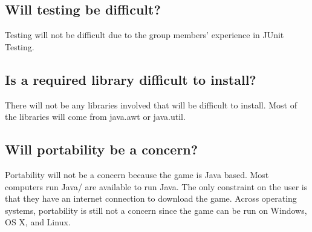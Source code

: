\documentclass{article}
\begin{document}
\subsection{Will testing be difficult?}
Testing will not be difficult due to the group members' experience in JUnit Testing.
\subsection{Is a required library difficult to install?}
There will not be any libraries involved that will be difficult to install. Most of the libraries will come from java.awt or java.util.
\subsection{Will portability be a concern?}
Portability will not be a concern because the game is Java based. Most computers run Java/ are available to run Java. The only constraint on the user is that they have an internet connection to download the game. Across operating systems, portability is still not a concern since the game can be run on Windows, OS X, and Linux.
\end{document}
